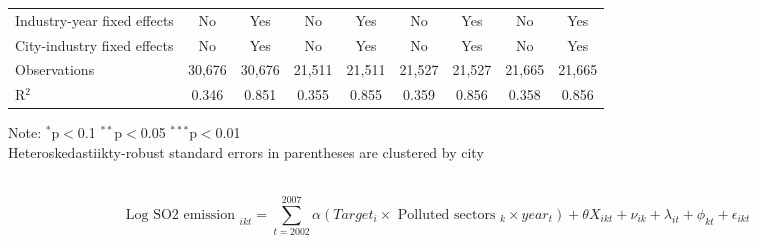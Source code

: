 \documentclass[12pt]{article}
\begin{document}
\begin{table}[!htbp]
\begin{adjustbox}{width=\textwidth, totalheight=\baselineskip,keepaspectratio}
\begin{tabular}{@{\extracolsep{5pt}}lcccccccc}
Industry-year fixed effects & No & Yes & No & Yes & No & Yes & No & Yes \\ 
City-industry fixed effects & No & Yes & No & Yes & No & Yes & No & Yes \\ 
Observations & 30,676 & 30,676 & 21,511 & 21,511 & 21,527 & 21,527 & 21,665 & 21,665 \\ 
R$^{2}$ & 0.346 & 0.851 & 0.355 & 0.855 & 0.359 & 0.856 & 0.358 & 0.856 \\ 
    \end{tabular}
    \end{adjustbox}
    \begin{tablenotes}
      \small
      \item 
      Note: $^{*}$p$<$0.1 $^{**}$p$<$0.05 $^{***}$p$<$0.01 \\
      Heteroskedastiikty-robust standard errors in parentheses are clustered by city \\
      \\
    \end{tablenotes}
\end{table}

\begin{equation} \label{eq:equation_3}
 \text {Log SO2 emission }_{i k t}=\sum_{t=2002}^{2007} \alpha (Target_{i}  \times \text { Polluted sectors }_{k} \times year _{t}) +\theta {X}_{i k t}+\nu_{ik}+\lambda_{it} +\phi_{kt} +\epsilon_{ikt} 
\end{equation}
\end{document}
